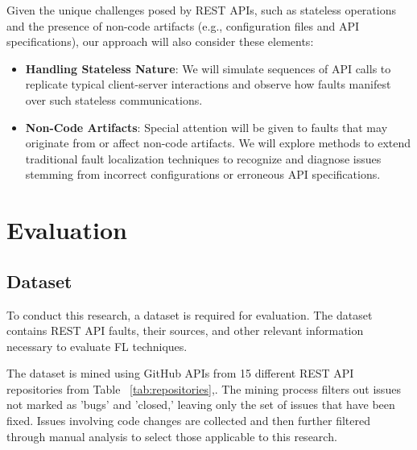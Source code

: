 \documentclass[conference]{IEEEtran}
\begin{document}
Given the unique challenges posed by REST APIs, such as stateless operations and the presence of non-code artifacts (e.g., configuration files and API specifications), our approach will also consider these elements:
\begin{itemize}
    \item \textbf{Handling Stateless Nature}: We will simulate sequences of API calls to replicate typical client-server interactions and observe how faults manifest over such stateless communications.
    \item \textbf{Non-Code Artifacts}: Special attention will be given to faults that may originate from or affect non-code artifacts. We will explore methods to extend traditional fault localization techniques to recognize and diagnose issues stemming from incorrect configurations or erroneous API specifications.
\end{itemize}


\section{Evaluation}
\label{sec:evaluation}

\subsection{Dataset}
\label{sec:dataset}

To conduct this research, a dataset is required for evaluation. The dataset contains REST API faults, their sources, and other relevant information necessary to evaluate FL techniques.

The dataset is mined using GitHub APIs from 15 different REST API repositories from Table ~\ref{tab:repositories},. The mining process filters out issues not marked as 'bugs' and 'closed,' leaving only the set of issues that have been fixed. Issues involving code changes are collected and then further filtered through manual analysis to select those applicable to this research.
\end{document}
